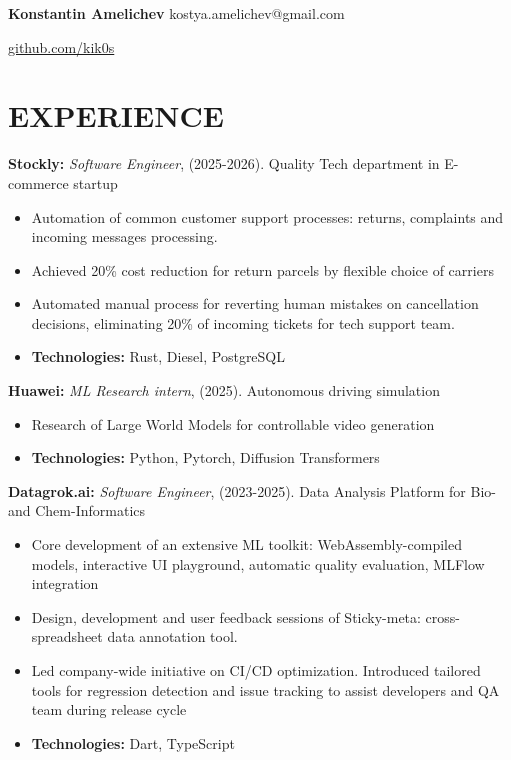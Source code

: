 \documentclass[paper=a4,fontsize=11pt]{scrartcl} %
\newcommand{\sepspace}{\vspace*{0em}}		%
\newcommand{\NameEmailPhoneSiteGithub}[3]{
        \Huge \usefont{OT1}{phv}{m}{n} \textbf{#1} 
        \large \usefont{OT1}{phv}{m}{n} \hfill #2
        
        \hfill #3
        \par \normalsize \normalfont
}
\newcommand{\NewPart}[1]{\section*{\uppercase{#1}}}
\begin{document}
\NameEmailPhoneSiteGithub{Konstantin Amelichev}{kostya.amelichev@gmail.com}{\href{https://github.com/kik0s}{github.com/kik0s}}

\sepspace


\NewPart{Experience}{}

 \textbf{Stockly:} \textit{Software Engineer}, (2025-2026). Quality Tech department in E-commerce startup
    \begin{itemize}
      \itemsep 0em 
       \item Automation of common customer support processes: returns, complaints and incoming messages processing.  
       \item Achieved 20\% cost reduction for return parcels by flexible choice of carriers
       \item Automated manual process for reverting human mistakes on cancellation decisions, eliminating 20\% of incoming tickets for tech support team.
       \item \textbf{Technologies:} Rust, Diesel, PostgreSQL
    \end{itemize}

\textbf{Huawei:} \textit{ML Research intern}, (2025). Autonomous driving simulation
    \begin{itemize}
      \itemsep 0em 
      \item Research of Large World Models for controllable video generation
      \item \textbf{Technologies:} Python, Pytorch, Diffusion Transformers
    \end{itemize}

 \textbf{Datagrok.ai:} \textit{Software Engineer}, (2023-2025). Data Analysis Platform for Bio- and Chem-Informatics
    \begin{itemize}
    \itemsep 0em 
        \item Core development of an extensive ML toolkit: WebAssembly-compiled models, interactive UI playground, automatic quality evaluation, MLFlow integration
        \item Design, development and user feedback sessions of Sticky-meta: cross-spreadsheet data annotation tool. 
        \item Led company-wide initiative on CI/CD optimization. Introduced tailored tools for regression detection and issue tracking to assist developers and QA team during release cycle 
        \item \textbf{Technologies:} Dart, TypeScript
    \end{itemize}
\end{document}
